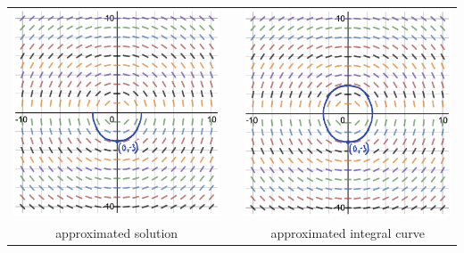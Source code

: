 \begin{example}
\setlength{\len}{175pt}
\begin{center}
\begin{tabular}{ccc}
\includegraphics*[width=\len]{images/module9-slopefield-ex1-sol.png}
 & & 
\includegraphics*[width=\len]{images/module9-slopefield-ex1-intcurve.png}\\
approximated solution & & approximated integral curve
\end{tabular}
\end{center}


\end{example}
